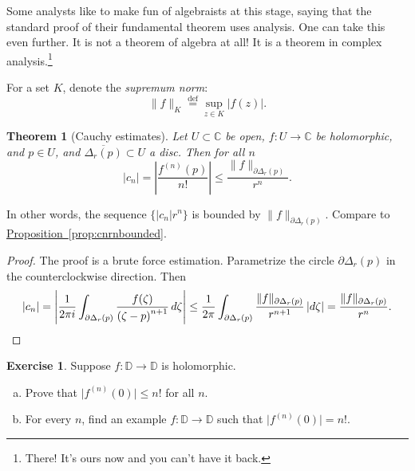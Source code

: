\documentclass[12pt,openany]{book}
\newcommand{\sabs}[1]{\lvert {#1} \rvert}
\newcommand{\snorm}[1]{\lVert {#1} \rVert}
\newcommand{\abs}[1]{\left\lvert {#1} \right\rvert}
\newcommand{\C}{{\mathbb{C}}}
\newcommand{\D}{{\mathbb{D}}}
\newcommand{\myindex}[1]{#1\index{#1}}
\theoremstyle{plain}
\newtheorem{thm}{Theorem}[section]
\theoremstyle{remark}
\theoremstyle{definition}
\newenvironment{exbox}{%
    \def\FrameCommand{\vrule width 1pt \relax\hspace {10pt}}%
    \MakeFramed {\advance \hsize -\width \FrameRestore }%
}{%
    \endMakeFramed
}
\newenvironment{exparts}{%
    \leavevmode\begin{enumerate}[a),noitemsep,topsep=0pt,parsep=0pt,partopsep=0pt]
}{%
    \end{enumerate}
}
\theoremstyle{exercise}
\newtheorem{exercise}{Exercise}[section]
\theoremstyle{example}
\newcommand{\propref}[1]{\hyperref[#1]{Proposition~\ref*{#1}}}
\begin{document}
Some analysts like to make fun of algebraists at this stage, saying that the
standard proof of their fundamental theorem uses analysis.
One can take this even further.
It is not a theorem of algebra at all!
It is a theorem in
complex analysis.\footnote{There! It's ours now and you can't have it back.}

For a set $K$, denote the \emph{\myindex{supremum norm}}:
%
\begin{equation*}
\snorm{f}_K
\overset{\text{def}}{=}
\sup_{z \in K} \sabs{f(z)} .
\end{equation*}

\begin{thm}[Cauchy estimates]
Let $U \subset \C$ be open, $f \colon U \to \C$ be
holomorphic, and $p \in U$, and $\overline{\Delta_r(p)} \subset U$
a disc.
Then for all $n$
\begin{equation*}
\sabs{c_n} =
\abs{\frac{f^{(n)}(p)}{n!}}
\leq
\frac{\snorm{f}_{\partial \Delta_r(p)}}{r^{n}} .
\end{equation*}
\end{thm}

In other words, the sequence $\bigl\{ \sabs{c_n} r^n \bigr\}$ is bounded by
$\snorm{f}_{\partial \Delta_r(p)}$.  Compare to \propref{prop:cnrnbounded}.

\begin{proof}
The proof is a brute force estimation.  Parametrize 
the circle $\partial \Delta_r(p)$ in the counterclockwise direction.  Then
\begin{equation*}
\sabs{c_n} = 
\abs{
\frac{1}{2\pi i}
\int_{\partial \Delta_r(p)}
\frac{f(\zeta)}{{(\zeta-p)}^{n+1}}
\,
d \zeta 
}
\leq
\frac{1}{2\pi}
\int_{\partial \Delta_r(p)}
\frac{\snorm{f}_{\partial \Delta_r(p)}}{r^{n+1}}
\,
\sabs{d \zeta} 
=
\frac{\snorm{f}_{\partial \Delta_r(p)}}{r^{n}} .
\qedhere
\end{equation*}
\end{proof}

\begin{exbox}
\begin{exercise}
Suppose $f \colon \D \to \D$ is holomorphic.
\begin{exparts}
\item
Prove that $\sabs{f^{(n)}(0)}
\leq n!$ for all $n$.
\item
For every $n$, find an example $f \colon \D \to \D$ such that
$\sabs{f^{(n)}(0)} = n!$.
\end{exparts}
\end{exercise}
\end{exbox}
\end{document}

